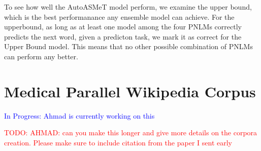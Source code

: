 \documentclass[11pt]{article}
\newcommand{\todo}[1]{\textcolor{red}{TODO: #1}}
\newcommand{\comment}[1]{\textcolor{blue}{In Progress: #1}}
\begin{document}
To see how well the AutoASMeT model perform, we examine the upper bound, which is the best performanance any ensemble model can achieve. For the upperbound, as long as at least one model among the four PNLMs correctly predicts the next word, given a predicton task, we mark it as correct for the Upper Bound model. This means that no other possible combination of PNLMs can perform any better.

\section{Medical Parallel Wikipedia Corpus} \label{sec:medical_corpora}\comment{Ahmad is currently working on this}

\todo{AHMAD: can you make this longer and give more details on the corpora creation. Please make sure to include citation from the paper I sent early}
\end{document}
